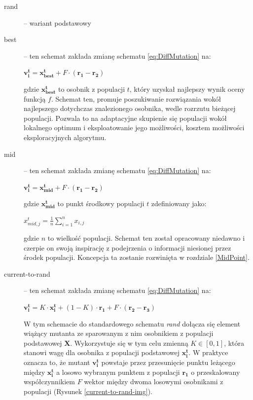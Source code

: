 \documentclass[12pt,a4paper]{report}
\begin{document}
{{{{\begin{description}
\item[rand] \cite{RainerStorn,SpringerIntroToEvol} -- wariant podstawowy
\item[best] \cite{PracticalInsights} -- ten schemat zakłada zmianę schematu \ref{eq:DiffMutation} na:
\begin{center}
 $\mathbf{v_i^{t}} = \mathbf{x_{best}^t} + F \cdot (\mathbf{r_{1}} - \mathbf{r_{2}})$
\end{center}
gdzie $\mathbf{x_{best}^t}$ to osobnik z populacji $t$, który uzyskał najlepszy wynik oceny funkcją $f$. Schemat ten, promuje poszukiwanie rozwiązania wokół najlepszego dotychczas znalezionego osobnika, wedle rozrzutu bieżącej populacji. Pozwala to na adaptacyjne skupienie się populacji wokół lokalnego optimum i eksploatowanie jego możliwości, kosztem możliwości eksploracyjnych algorytmu.
\item[mid] \cite{DEmid} -- ten schemat zakłada zmianę schematu \ref{eq:DiffMutation} na:
\begin{center}
 $\mathbf{v_i^{t}} = \mathbf{x_{mid}^t} + F \cdot (\mathbf{r_{1}} - \mathbf{r_{2}})$
\end{center}
gdzie $\mathbf{x_{mid}^t}$ to punkt środkowy populacji $t$ zdefiniowany jako:
\begin{center}
$x_{mid,j}^t = \frac{1}{n}\sum_{i=1}^n{x_{i,j}}$
\end{center}
gdzie $n$ to wielkość populacji. Schemat ten został opracowany niedawno i czerpie on swoją inspirację z podejrzenia o informacji niesionej przez środek populacji. Koncepcja ta zostanie rozwinięta w rozdziale \ref{MidPoint}.

\item[current-to-rand] \cite{PracticalInsights} -- ten schemat zakłada zmianę schematu \ref{eq:DiffMutation} na:
\begin{center}
 $\mathbf{v_i^{t}} = K \cdot \mathbf{x_i^t} + (1 - K) \cdot \mathbf{r_{1}} + F \cdot (\mathbf{r_{2}} - \mathbf{r_{3}})$ \
\end{center}
W tym schemacie do standardowego schematu \emph{rand} dołącza się element wiążący mutanta ze sparowanym z nim osobnikiem z populacji podstawowej $\mathbf{X}$. Wykorzystuje się w tym celu zmienną $K \in [0, 1]$, która stanowi wagę dla osobnika z populacji podstawowej $\mathbf{x_i^t}$. W praktyce oznacza to, że mutant $\mathbf{v_i^t}$ powstaje przez przesunięcie punktu leżącego między $\mathbf{x_i^t}$ a losowo wybranym punktem z populacji $\mathbf{r_1}$ o przeskalowany współczynnikiem $F$ wektor między dwoma losowymi osobnikami z populacji (Rysunek \ref{current-to-rand-img}).


\end{description}}}}}
\end{document}
